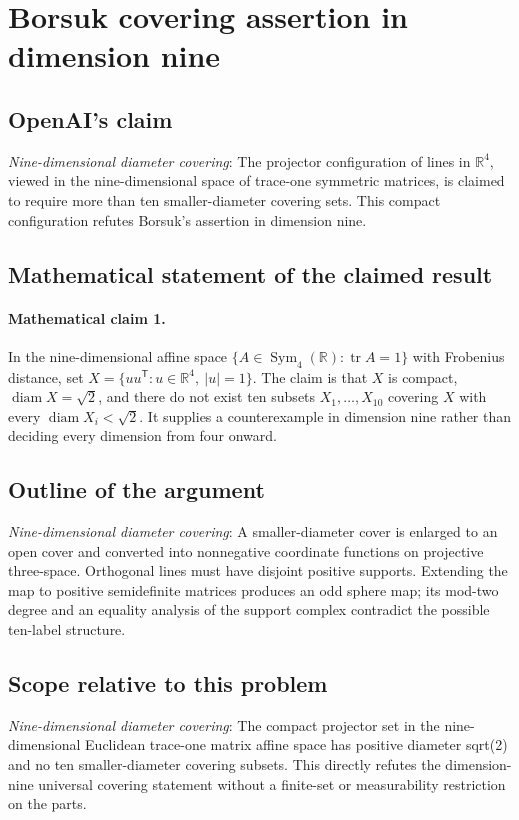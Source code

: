 \documentclass[11pt]{article}
\begin{document}
\section*{Borsuk covering assertion in dimension nine}

\subsection{OpenAI's claim}
\textit{Nine-dimensional diameter covering}: The projector configuration of lines in $\mathbb R^4$, viewed in the nine-dimensional space of trace-one symmetric matrices, is claimed to require more than ten smaller-diameter covering sets. This compact configuration refutes Borsuk’s assertion in dimension nine.

\subsection{Mathematical statement of the claimed result}
\paragraph{Mathematical claim 1.} In the nine-dimensional affine space $\{A\in\operatorname{Sym}_4(\mathbb R):\operatorname{tr}A=1\}$ with Frobenius distance, set $X=\{uu^{\mathsf T}:u\in\mathbb R^4,\ |u|=1\}$. The claim is that $X$ is compact, $\operatorname{diam}X=\sqrt2$, and there do not exist ten subsets $X_1,\ldots,X_{10}$ covering $X$ with every $\operatorname{diam}X_i<\sqrt2$. It supplies a counterexample in dimension nine rather than deciding every dimension from four onward.

\subsection{Outline of the argument}
\textit{Nine-dimensional diameter covering}: A smaller-diameter cover is enlarged to an open cover and converted into nonnegative coordinate functions on projective three-space. Orthogonal lines must have disjoint positive supports. Extending the map to positive semidefinite matrices produces an odd sphere map; its mod-two degree and an equality analysis of the support complex contradict the possible ten-label structure.

\subsection{Scope relative to this problem}
\textit{Nine-dimensional diameter covering}: The compact projector set in the nine-dimensional Euclidean trace-one matrix affine space has positive diameter sqrt(2) and no ten smaller-diameter covering subsets. This directly refutes the dimension-nine universal covering statement without a finite-set or measurability restriction on the parts.
\end{document}
